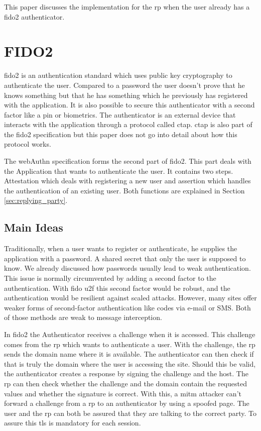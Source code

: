 \documentclass[a4paper, 11pt]{scrartcl}
\begin{document}
This paper discusses the implementation for the \gls{rp} when the user already has a \gls{fido2} authenticator.

\section{FIDO2}

\gls{fido2} is an authentication standard which uses public key cryptography to authenticate the user. Compared to a password the user doesn't prove that he knows something but that he has something which he previously has registered with the application. It is also possible to secure this authenticator with a second factor like a pin or biometrics. The authenticator is an external device that interacts with the application through a protocol called \gls{ctap}. \gls{ctap} is also part of the \gls{fido2} specification but this paper does not go into detail about how this protocol works\cite{ctap}.

The \gls{webAuthn} specification forms the second part of \gls{fido2}. This part deals with the Application that wants to authenticate the user. It contains two steps. Attestation which deals with registering a new user and assertion which handles the authentication of an existing user. Both functions are explained in Section \ref{sec:replying_party}.

\subsection{Main Ideas}

Traditionally, when a user wants to register or authenticate, he supplies the application with a password. A shared secret that only the user is supposed to know. We already discussed how passwords usually lead to weak authentication. This issue is normally circumvented by adding a second factor to the authentication. With \gls{fido} \gls{u2f} this second factor would be robust, and the authentication would be resilient against scaled attacks. However, many sites offer weaker forms of second-factor authentication like codes via e-mail or SMS. Both of those methods are weak to message interception\cite{smsweak}.

In \gls{fido2} the Authenticator receives a challenge when it is accessed. This challenge comes from the \gls{rp} which wants to authenticate a user. With the challenge, the \gls{rp} sends the domain name where it is available. The authenticator can then check if that is truly the domain where the user is accessing the site. Should this be valid, the authenticator creates a response by signing the challenge and the host. The \gls{rp} can then check whether the challenge and the domain contain the requested values and whether the signature is correct. With this, a \gls{mitm} attacker can't forward a challenge from a \gls{rp} to an authenticator by using a spoofed page. The user and the \gls{rp} can both be assured that they are talking to the correct party. To assure this \gls{tls} is mandatory for each session\cite{yubico:whatIsFido2}.
\end{document}
